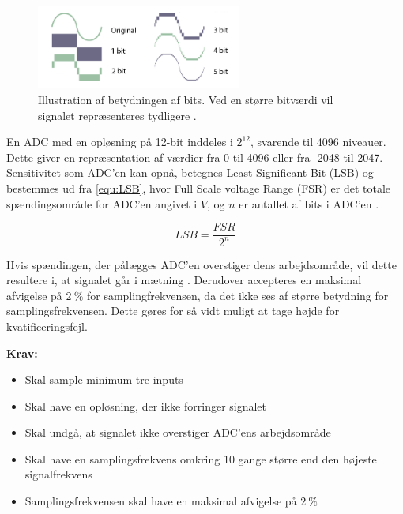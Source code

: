\begin{figure}[H]
\centering
\includegraphics[width=0.6\textwidth]{figures/problemloesning/ADC_bit}
\caption{Illustration af betydningen af bits. Ved en større bitværdi vil signalet repræsenteres tydligere \citep{adc2010}.}
\label{fig:ADC_bit}
\end{figure}

\noindent
En ADC med en opløsning på 12-bit inddeles i ${2}^{12}$, svarende til 4096 niveauer. Dette giver en repræsentation af værdier fra 0 til 4096 eller fra -2048 til 2047. Sensitivitet som ADC'en kan opnå, betegnes Least Significant Bit (LSB) og bestemmes ud fra \autoref{equ:LSB}, hvor Full Scale voltage Range (FSR) er det totale spændingsområde for ADC'en angivet i $V$, og $n$ er antallet af bits i ADC'en \citep{webster1998, wolf2004}.

\begin{equation} \label{equ:LSB}
LSB=\dfrac{FSR}{2^{n}}
\end{equation}

\noindent
Hvis spændingen, der pålægges ADC'en overstiger dens arbejdsområde, vil dette resultere i, at signalet går i mætning \citep{webster1998, wolf2004}. 
Derudover accepteres en maksimal afvigelse på $2~\%$ for samplingfrekvensen, da det ikke ses af større betydning for samplingsfrekvensen. Dette gøres for så vidt muligt at tage højde for kvatificeringsfejl. 

\vspace{3mm}
\textbf{Krav:}
\begin{itemize}
\item Skal sample minimum tre inputs 
\item Skal have en opløsning, der ikke forringer signalet
\item Skal undgå, at signalet ikke overstiger ADC'ens arbejdsområde
\item Skal have en samplingsfrekvens omkring 10 gange større end den højeste signalfrekvens
\item Samplingsfrekvensen skal have en maksimal afvigelse på $2~\%$
\end{itemize}

